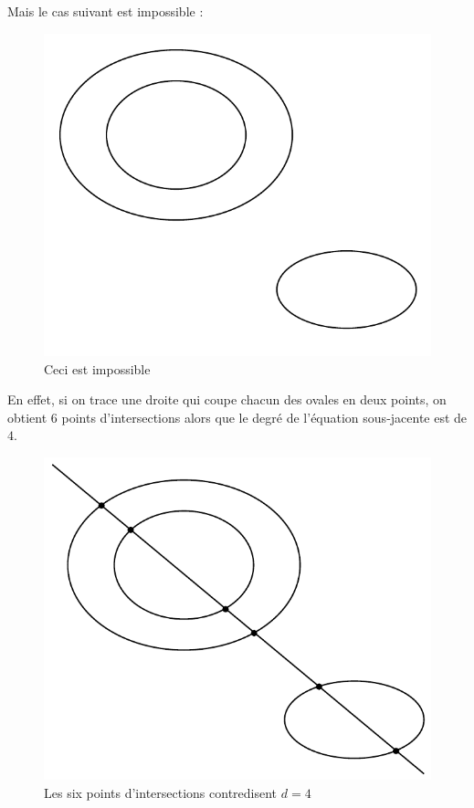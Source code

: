\documentclass{livre}
\begin{document}
Mais le cas suivant est impossible :
\begin{figure}[H]
\begin{center}
\includegraphics[scale=0.6]{fig2}
\end{center}
\caption{Ceci est impossible}
\end{figure}
En effet, si on trace une droite qui coupe chacun des ovales en deux points, on obtient $6$ points d'intersections alors que le degré de l'équation sous-jacente est de $4$.
\begin{figure}[H]
\begin{center}
\includegraphics[scale=0.55]{fig3}
\end{center}
\caption{Les six points d'intersections contredisent $d=4$}
\end{figure}
\end{document}
